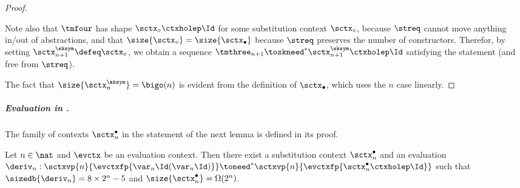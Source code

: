 \begin{proof}
\begin{itemize}
Note also that $\tmfour$ has shape $\sctx_\circ\ctxholep\Id$ for some substitution context $\sctx_\circ$, because $\streq$ cannot move anything in/out of abstractions, and that $\size{\sctx_\circ} = \size{\sctx_\bullet}$ because $\streq$ preserves the number of constructors. Therefor, by setting $\sctx_{n+1}^{\sksym} \defeq \sctx_\circ$, we obtain a sequence $\tmthree_{n+1} \toskneed^* \sctx_{n+1}^{\sksym}\ctxholep\Id$ satisfying the statement (and free from $\streq$).
  \end{itemize}
    The fact that $\size{\sctx_n^{\sksym}} = \bigo(n)$ is evident from the definition of $\sctx_\bullet$, which uses the $n$ case linearly.\qedhere
\end{proof}

\subparagraph{Evaluation in \cbneed.}
The family of contexts $\sctx^\bullet_n$ in the statement of the next lemma is defined in its proof.

\begin{lemma}
\label{l:need-family-aux}
    Let $n \in \nat$ and $\evctx$ be an evaluation context.
  Then there exist a substitution context $\sctx^\bullet_n$ and an evaluation
  $\deriv_n: \sctxvp{n}{\evctxfp{\var_n\Id(\var_n\Id)}} \toneed^*
  \sctxvp{n}{\evctxfp{\sctx^\bullet_n\ctxholep\Id}}$ such that
  $\sizedb{\deriv_n} = 8 \times 2^n - 5$ and $\size{\sctx^\bullet_n} = \Omega(2^n)$.
\end{lemma}


